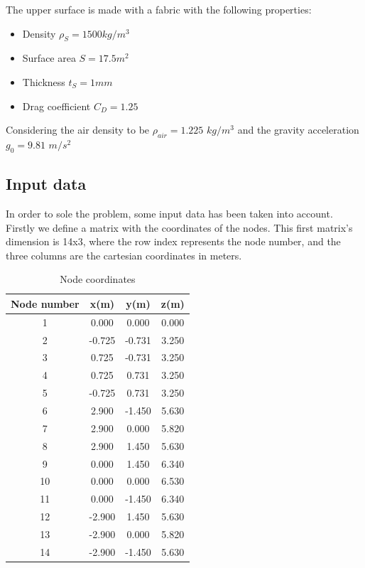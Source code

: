 The upper surface is made with a fabric with the following properties:

\begin{itemize}
	\item Density $\rho_S = 1500 kg/m^3$
	\item Surface area $S = 17.5m^2$
	\item Thickness $t_S = 1mm$
	\item Drag coefficient $C_D = 1.25$
\end{itemize}

Considering the air density to be $\rho_{air} = 1.225$ $kg/m^3$ and the gravity
acceleration $g_0 = 9.81$ $m/s^2$

\subsection{Input data}

In order to sole the problem, some input data has been taken into account.
Firstly we define a matrix with the coordinates of the nodes. This first matrix's
dimension is 14x3, where the row index represents the node number, and the three columns
are the cartesian coordinates in meters.

\begin{table}[h]
\centering
\begin{tabular}{|c|c|c|c|}
\hline
\textbf{Node number} & \textbf{x(m)} & \textbf{y(m)} & \textbf{z(m)} \\ \hline
1 & 	0.000 	&	 0.000  	& 0.000	\\ \hline
2 & 	-0.725	&	 -0.731  	& 3.250	\\ \hline
3 & 	0.725 	&	-0.731  	& 3.250	\\ \hline
4 & 	0.725 	&	 0.731  	& 3.250	\\ \hline
5 & 	-0.725	&	  0.731  	& 3.250	\\ \hline
6 & 	2.900 	&	-1.450  	& 5.630	\\ \hline
7 & 	2.900 	&	 0.000  	& 5.820	\\ \hline
8 & 	2.900 	&	 1.450  	& 5.630	\\ \hline
9 & 	0.000 	&	 1.450  	& 6.340	\\ \hline
10 & 	0.000 	&	 0.000  	& 6.530	\\ \hline
11 & 	0.000 	&	-1.450  	& 6.340	\\ \hline
12 & 	-2.900	&	  1.450  	& 5.630	\\ \hline
13 & 	-2.900	&	  0.000  	& 5.820	\\ \hline
14 & 	-2.900	&	 -1.450  	& 5.630	\\ \hline
\end{tabular}
\caption{Node coordinates}
\label{tab:coordinates}
\end{table}

